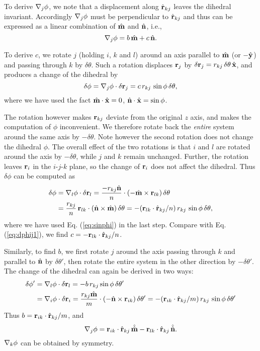 \documentclass{article}
\begin{document}
To derive $\nabla_j \phi$, we note that a displacement along $\hat{\mathbf{r}}_{kj}$ 
leaves the dihedral invariant. 
Accordingly $\nabla_j \phi$ must be perpendicular to $\hat{\mathbf{r}}_{kj}$ 
and thus can be expressed as a linear combination of $\hat{\mathbf{m}}$ and $\hat{\mathbf{n}}$, i.e.,
\[
\nabla_j \phi = b \, \hat{\mathbf{m}} + c \, \hat{\mathbf{n}}.
\]

To derive $c$, we rotate $j$ (holding $i$, $k$ and $l$) around 
an axis parallel to $\hat{\mathbf{m}}$ (or $-\hat{\mathbf{y}}$) and passing through $k$ by $\delta \theta$.
Such a rotation displaces $\mathbf{r}_j$ by 
%
$\delta \mathbf{r}_j = r_{kj} \, \delta \theta \, \hat{\mathbf{x}}$,
%
and produces a change of the dihedral by
\begin{equation}
\delta \phi
  = \nabla_j \phi \cdot \delta \mathbf{r}_j 
  = c \, r_{kj} \, \sin \phi \, \delta \theta, 
\label{eq:dphij1}
\end{equation}
where we have used the fact $\hat{\mathbf{m}} \cdot \hat{\mathbf{x}} = 0$, $\hat{\mathbf{n}} \cdot \hat{\mathbf{x}} = \sin \phi$.


The rotation however makes $\mathbf{r}_{kj}$ deviate from the original $z$ axis,
  and makes the computation of $\phi$ inconvenient.
We therefore rotate back the \emph{entire} system around the same axis by $-\delta \theta$.
Note however the second rotation does not change the dihedral $\phi$.
The overall effect of the two rotations is that 
  $i$ and $l$ are rotated around the axis by $-\delta \theta$, 
   while $j$ and $k$ remain unchanged.
%
%
Further, the rotation leaves $\mathbf{r}_i$ in the $i$-$j$-$k$ plane,
so the change of $\mathbf{r}_i$ does not affect the dihedral.
%
Thus $\delta \phi$ can be computed as 
\begin{equation*}
\begin{split}
\delta \phi
  &= \nabla_l \phi \cdot \delta \mathbf{r}_l = 
 \frac{-r_{kj} \hat{\mathbf{n}}}{n} \cdot (-\hat{\mathbf{m}} \times \mathbf{r}_{lk}) \, \delta \theta  \\
  &= \frac{r_{kj}}{n} \, \mathbf{r}_{lk} \cdot (\hat{\mathbf{n}} \times \hat{\mathbf{m}}) \, \delta \theta
  = -(\mathbf{r}_{lk} \cdot \hat{\mathbf{r}}_{kj} / n )\, r_{kj} \, \sin \phi \, \delta \theta,
\end{split}
\end{equation*}
%
where we have used Eq. (\ref{eq:sinphi}) in the last step.
%
Compare with Eq. (\ref{eq:dphij1}), we find $c=-\mathbf{r}_{lk}\cdot\hat{\mathbf{r}}_{kj}/n$.


Similarly, to find $b$, we first rotate $j$ around the axis passing through $k$ 
and parallel to $\hat{\mathbf{n}}$ by $\delta \theta'$,
then rotate the entire system in the other direction by $-\delta \theta'$.
%
The change of the dihedral can again be derived in two ways:
\begin{equation*}
\begin{split}
\delta \phi'
  & = \nabla_l \phi \cdot \delta \mathbf{r}_l = -b \, r_{kj} \sin \phi \, \delta \theta' \\
  & = \nabla_i \phi \cdot \delta \mathbf{r}_i
    = \frac{r_{kj} \hat{\mathbf{m}}} {m} \cdot (-\hat{\mathbf{n}} \times \mathbf{r}_{ik}) \, \delta \theta'
    = - (\mathbf{r}_{ik} \cdot \hat{\mathbf{r}}_{kj}/m) \, r_{k j} \,  \sin \phi \,  \delta \theta'
\end{split}
\end{equation*}
Thus $b = \mathbf{r}_{ik} \cdot \hat{\mathbf{r}}_{kj}/m$, and 
%
\[
  \nabla_j \phi = \mathbf{r}_{ik} \cdot \hat{\mathbf{r}}_{kj} \, \hat{\hat{\mathbf{m}}} - \mathbf{r}_{lk}\cdot \hat{\mathbf{r}}_{kj} \, \hat{\hat{\mathbf{n}}}.
\]
$\nabla_k \phi$ can be obtained by symmetry.
\end{document}
